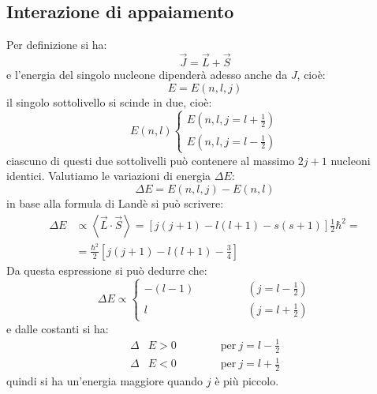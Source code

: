 \subsection{Interazione di appaiamento}
Per  definizione si ha: 
\begin{equation}
\vec{J} = \vec{L} + \vec{S}
\end{equation}
e l'energia del singolo nucleone dipenderà adesso anche da $J$, cioè:
\begin{equation}
E = E{(n, l, j)}
\end{equation}
il singolo sottolivello si scinde in due, cioè:
\begin{equation}
E{(n,l)} \begin{cases}
E{(n, l, j = l + \frac{1}{2})}\\
E{(n, l, j = l - \frac{1}{2})}
\end{cases}
\end{equation}
ciascuno di questi due sottolivelli può contenere al massimo $2j + 1$ nucleoni identici. Valutiamo le variazioni di energia $\Delta E$:
\begin{equation}
\Delta E = E{(n, l, j)} - E{(n,l)}
\end{equation}
in base alla formula di Landè si può scrivere:
\begin{equation}
\begin{split}
\Delta E &\propto \left\langle \vec{L} \cdot \vec{S} \right\rangle = \left[ j(j+1) - l(l+1) - s(s+1) \right] \frac{1}{2} \hbar^2 =\\
&= \frac{\hbar ^2}{2} \left[  j(j+1) - l(l+1) - \frac{3}{4} \right]
\end{split}
\end{equation}
Da questa espressione si può dedurre che:
\begin{equation}
\Delta E \propto \begin{cases}
-(l-1) \qquad \qquad &(j = l - \frac{1}{2})\\
l \qquad &(j = l + \frac{1}{2})
\end{cases}
\end{equation}
e dalle costanti si ha:
\begin{equation}
\begin{split}
\Delta &E > 0 \qquad \qquad \text{per}\ j = l - \frac{1}{2}\\
\Delta &E < 0 \qquad \qquad \text{per}\ j = l + \frac{1}{2}
\end{split}
\end{equation}
quindi si ha un'energia maggiore quando $j$ è più piccolo.

